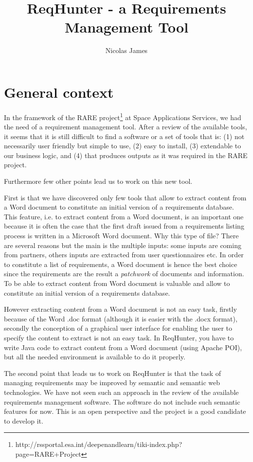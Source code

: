 \documentclass{llncs}
\title{ReqHunter - a Requirements Management Tool}
\author{Nicolas James}
\institute{Space Applications Services\\
nicolas.james@spaceapplications.com}
\begin{document}
\maketitle

\section{General context}
In the framework of the RARE project\footnote{http://rssportal.esa.int/deepenandlearn/tiki-index.php?page=RARE+Project} at Space Applications Services, we had the need of a requirement management tool. After a review of the available tools, it seems that it is still difficult to find a software or a set of tools that is: (1) not necessarily user friendly but simple to use, (2) easy to install, (3) extendable to our business logic, and (4) that produces outputs as it was required in the RARE project.

Furthermore few other points lead us to work on this new tool. 

First is that we have discovered only few tools that allow to extract content from a Word document to constitute an initial version of a requirements database. This feature, i.e. to extract content from a Word document, is an important one because it is often the case that the first draft issued from a requirements listing process is written in a Microsoft Word document. Why this type of file? There are several reasons but the main is the multiple inputs: some inputs are coming from partners, others inputs are extracted from user questionnaires etc. In order to constitute a list of requirements, a Word document is hence the best choice since the requirements are the result a \textit{patchwork} of documents and information. To be able to extract content from Word document is valuable and allow to constitute an initial version of a requirements database. 

However extracting content from a Word document is not an easy task, firstly because of the Word .doc format (although it is easier with the .docx format), secondly the conception of a graphical user interface for enabling the user to specify the content to extract is not an easy task. In ReqHunter, you have to write Java code to extract content from a Word document (using Apache POI), but all the needed environment is available to do it properly.

The second point that leads us to work on ReqHunter is that the task of managing requirements may be improved by semantic and semantic web technologies. We have not seen such an approach in the review of the available requirements management software. The software do not include such semantic features for now. This is an open perspective and the project is a good candidate to develop it.
\end{document}
